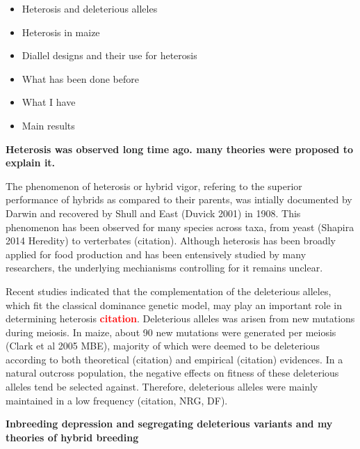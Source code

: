 \documentclass[10pt]{article}
\newcommand{\sme}[1]{\textcolor{red}{\bf #1}}
\begin{document}
\begin{itemize}
  \item Heterosis and deleterious alleles
  \item Heterosis in maize
  \item Diallel designs and their use for heterosis
  \item What has been done before
  \item What I have
  \item  Main results
\end{itemize}



\textbf{Heterosis was observed long time ago. many theories were proposed to explain it.}


The phenomenon of heterosis or hybrid vigor, refering to the superior performance of hybrids as compared to their parents, was intially documented by Darwin and recovered by Shull and East (Duvick 2001) in 1908. This phenomenon has been observed for many species across taxa, from yeast (Shapira 2014 Heredity) to verterbates (citation). Although heterosis has been broadly applied for food production and has been entensively studied by many researchers, the underlying mechianisms controlling for it remains unclear. 

Recent studies indicated that the complementation of the deleterious alleles, which fit the classical dominance genetic model, may play an important role in determining heterosis \sme{citation}. Deleterious alleles was arisen from new mutations during meiosis. In maize, about 90 new mutations were generated per meiosis (Clark et al 2005 MBE), majority of which were deemed to be deleterious according to both theoretical (citation) and empirical (citation) evidences. In a natural outcross population, the negative effects on fitness of these deleterious alleles tend be selected against. Therefore, deleterious alleles were mainly maintained in a low frequency (citation, NRG, DF). 




\textbf{Inbreeding depression and segregating deleterious variants and my theories of hybrid breeding}
\end{document}
